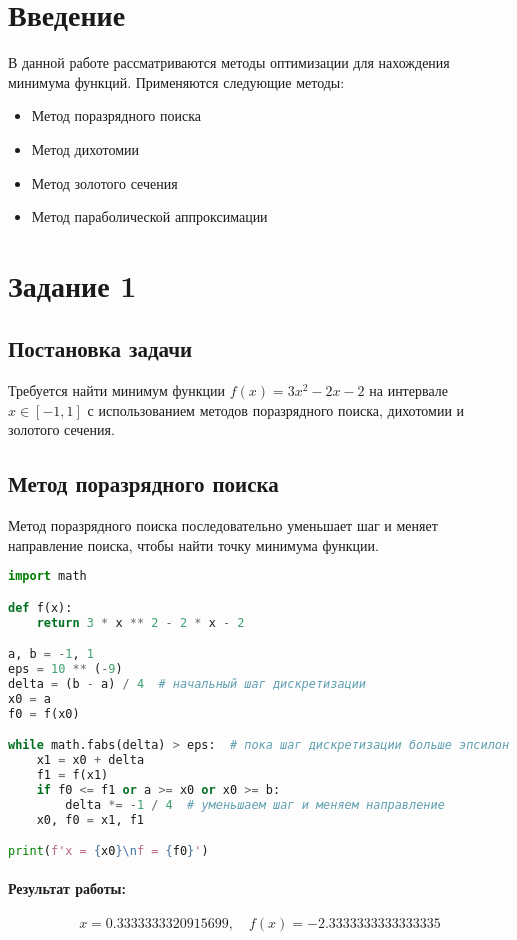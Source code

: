 \documentclass[a4paper,12pt]{article}
\begin{document}
\section*{Введение}
В данной работе рассматриваются методы оптимизации для нахождения минимума функций. Применяются следующие методы:
\begin{itemize}
    \item Метод поразрядного поиска
    \item Метод дихотомии
    \item Метод золотого сечения
    \item Метод параболической аппроксимации
\end{itemize}

\section*{Задание 1}
\subsection*{Постановка задачи}
Требуется найти минимум функции \( f(x) = 3x^2 - 2x - 2 \) на интервале \( x \in [-1, 1] \) с использованием методов поразрядного поиска, дихотомии и золотого сечения.

\subsection*{Метод поразрядного поиска}
Метод поразрядного поиска последовательно уменьшает шаг и меняет направление поиска, чтобы найти точку минимума функции.

\begin{lstlisting}[language=Python, caption=Метод поразрядного поиска]
import math

def f(x):
    return 3 * x ** 2 - 2 * x - 2

a, b = -1, 1
eps = 10 ** (-9)
delta = (b - a) / 4  # начальный шаг дискретизации
x0 = a
f0 = f(x0)

while math.fabs(delta) > eps:  # пока шаг дискретизации больше эпсилон
    x1 = x0 + delta
    f1 = f(x1)
    if f0 <= f1 or a >= x0 or x0 >= b:
        delta *= -1 / 4  # уменьшаем шаг и меняем направление
    x0, f0 = x1, f1

print(f'x = {x0}\nf = {f0}')
\end{lstlisting}

\paragraph{Результат работы:}
\[ 
x = 0.3333333320915699, \quad f(x) = -2.3333333333333335 
\]
\end{document}
